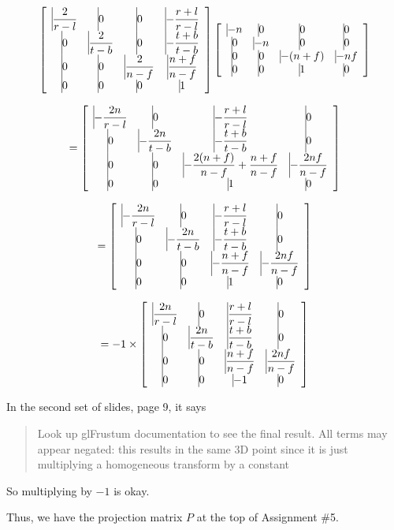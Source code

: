 \documentclass[11pt]{article}
\begin{document}
\begin{spacing}{1.2}
$$
\left[
	\begin{array}{*4{>{\displaystyle\vrule width 0pt height 16pt depth 12pt}c}}
		\frac{2}{r-l} & 0 & 0 & -\frac{r+l}{r-l} \cr
		0 & \frac{2}{t-b} & 0 & -\frac{t+b}{t-b} \cr
		0 & 0 & \frac{2}{n-f} & \frac{n+f}{n-f} \cr
		0 & 0 & 0 & 1 \cr
	\end{array}
\right]
\left[
	\begin{array}{*4{>{\displaystyle\vrule width 0pt height 16pt depth 12pt}c}}
		-n & 0 & 0 & 0 \cr
		0 & -n & 0 & 0 \cr
		0 & 0 & -(n+f) & -nf \cr
		0 & 0 & 1 & 0 \cr
	\end{array}
\right]
$$

$$
=
\left[
	\begin{array}{*4{>{\displaystyle\vrule width 0pt height 16pt depth 12pt}c}}
		-\frac{2n}{r-l} & 0 & -\frac{r+l}{r-l} & 0  \cr
		0 & -\frac{2n}{t-b} & -\frac{t+b}{t-b} & 0 \cr
		0 & 0 & -\frac{2(n+f)}{n-f} + \frac{n+f}{n-f} & -\frac{2nf}{n-f} \cr
		0 & 0 & 1 & 0 \cr
	\end{array}
\right]
$$

$$
=
\left[
	\begin{array}{*4{>{\displaystyle\vrule width 0pt height 16pt depth 12pt}c}}
		-\frac{2n}{r-l} & 0 & -\frac{r+l}{r-l} & 0  \cr
		0 & -\frac{2n}{t-b} & -\frac{t+b}{t-b} & 0 \cr
		0 & 0 & -\frac{n+f}{n-f} & -\frac{2nf}{n-f} \cr
		0 & 0 & 1 & 0 \cr
	\end{array}
\right]
$$

$$
=
-1 \times
\left[
	\begin{array}{*4{>{\displaystyle\vrule width 0pt height 16pt depth 12pt}c}}
		\frac{2n}{r-l} & 0 & \frac{r+l}{r-l} & 0  \cr
		0 & \frac{2n}{t-b} & \frac{t+b}{t-b} & 0 \cr
		0 & 0 & \frac{n+f}{n-f} & \frac{2nf}{n-f} \cr
		0 & 0 & -1 & 0 \cr
	\end{array}
\right]
$$

In the second set of slides, page 9, it says

\begin{quote}Look up glFrustum documentation to see the final result. All terms may
appear negated: this results in the same 3D point since it is just
multiplying a homogeneous transform by a constant
\end{quote}

So multiplying by $-1$ is okay.  

Thus, we have the projection matrix $P$ at the top of Assignment \#5.  

\end{spacing}
\end{document}
